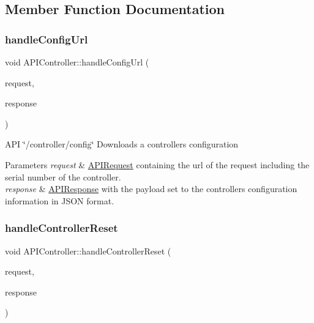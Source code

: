\subsection{Member Function Documentation}
\mbox{\label{class_a_p_i_controller_ac1fe4dd7b8df2e4cceb554e46bea894d}} 
\subsubsection{\texorpdfstring{handle\+Config\+Url}{handleConfigUrl}}
{\footnotesize\ttfamily void A\+P\+I\+Controller\+::handle\+Config\+Url (\begin{DoxyParamCaption}\item[{const \hyperlink{class_a_p_i_request}{A\+P\+I\+Request} \&}]{request,  }\item[{\hyperlink{class_a_p_i_response}{A\+P\+I\+Response} $\ast$}]{response }\end{DoxyParamCaption})\hspace{0.3cm}{\ttfamily [slot]}}

A\+PI \char`\"{}/controller/config\char`\"{} Downloads a controller\textquotesingle{}s configuration 
\begin{DoxyParams}{Parameters}
{\em request} & \hyperlink{class_a_p_i_request}{A\+P\+I\+Request} containing the url of the request including the serial number of the controller. \\
\hline
{\em response} & \hyperlink{class_a_p_i_response}{A\+P\+I\+Response} with the payload set to the controller\textquotesingle{}s configuration information in J\+S\+ON format. \\
\hline
\end{DoxyParams}
\mbox{\label{class_a_p_i_controller_a0e01eab749423dcfff0b595abf4175ad}} 
\subsubsection{\texorpdfstring{handle\+Controller\+Reset}{handleControllerReset}}
{\footnotesize\ttfamily void A\+P\+I\+Controller\+::handle\+Controller\+Reset (\begin{DoxyParamCaption}\item[{const \hyperlink{class_a_p_i_request}{A\+P\+I\+Request} \&}]{request,  }\item[{\hyperlink{class_a_p_i_response}{A\+P\+I\+Response} $\ast$}]{response }\end{DoxyParamCaption})\hspace{0.3cm}{\ttfamily [slot]}}

